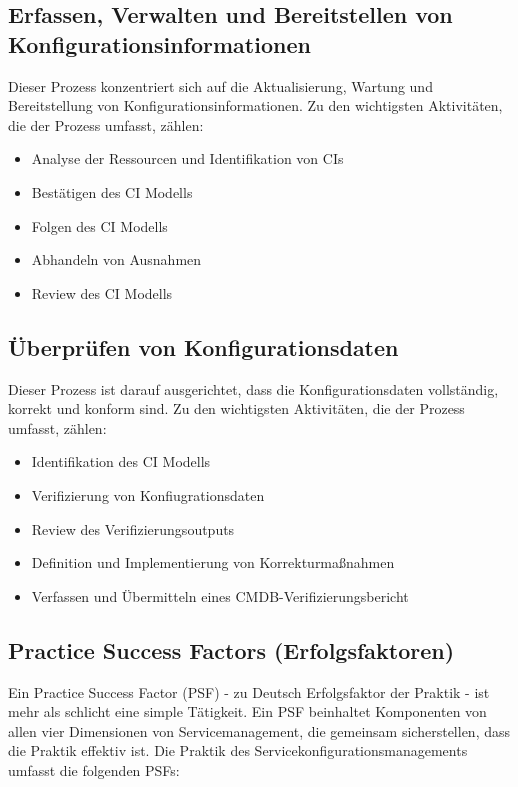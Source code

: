 \subsection*{Erfassen, Verwalten und Bereitstellen von Konfigurationsinformationen}

Dieser Prozess konzentriert sich auf die Aktualisierung, Wartung und Bereitstellung von Konfigurationsinformationen.
Zu den wichtigsten Aktivitäten, die der Prozess umfasst, zählen:

\begin{itemize}
	\item Analyse der Ressourcen und Identifikation von CIs
	\item Bestätigen des CI Modells
	\item Folgen des CI Modells
	\item Abhandeln von Ausnahmen
	\item Review des CI Modells
\end{itemize}

\subsection*{Überprüfen von Konfigurationsdaten}

Dieser Prozess ist darauf ausgerichtet, dass die Konfigurationsdaten vollständig, korrekt und konform sind.
Zu den wichtigsten Aktivitäten, die der Prozess umfasst, zählen:

\begin{itemize}
	\item Identifikation des CI Modells
	\item Verifizierung von Konfiugrationsdaten
	\item Review des Verifizierungsoutputs
	\item Definition und Implementierung von Korrekturmaßnahmen
	\item Verfassen und Übermitteln eines CMDB-Verifizierungsbericht
\end{itemize}

\subsection{Practice Success Factors (Erfolgsfaktoren)}
Ein Practice Success Factor (PSF) - zu Deutsch Erfolgsfaktor der Praktik -
ist mehr als schlicht eine simple Tätigkeit. Ein PSF beinhaltet Komponenten
von allen vier Dimensionen von Servicemanagement, die gemeinsam sicherstellen,
dass die Praktik effektiv ist. Die Praktik des Servicekonfigurationsmanagements umfasst die folgenden PSFs:

